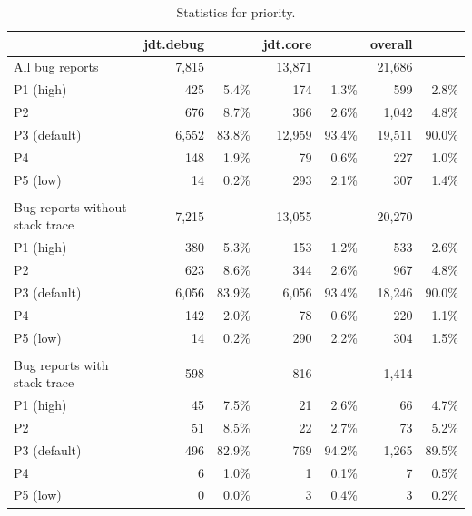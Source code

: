 \begin{table}[!ht]\footnotesize
	\centering
	\begin{tabular}{lrrrrrr}
		\toprule
		& jdt.debug && jdt.core && overall & \\
		\midrule
		All bug reports & 7,815 && 13,871 && 21,686 & \\
		\midrule
		P1 (high) & 425 & 5.4\% & 174 & 1.3\% & 599 & 2.8\%\\
		P2 & 676 & 8.7\% & 366 & 2.6\% & 1,042 & 4.8\%\\
		P3 (default) & 6,552 & 83.8\% & 12,959 & 93.4\% & 19,511 & 90.0\%\\
		P4 & 148 & 1.9\% & 79 & 0.6\% & 227 & 1.0\%\\
		P5 (low) & 14 & 0.2\% & 293 & 2.1\% & 307 & 1.4\%\\
		\\
		\midrule
		Bug reports without stack trace & 7,215 && 13,055 && 20,270 \\
		\midrule
		P1 (high) & 380 & 5.3\% & 153 & 1.2\% & 533 & 2.6\%\\
		P2 & 623 & 8.6\% & 344 & 2.6\% & 967 & 4.8\%\\
		P3 (default) & 6,056 & 83.9\% & 6,056 & 93.4\% & 18,246 & 90.0\%\\
		P4 & 142 & 2.0\% & 78 & 0.6\% & 220 & 1.1\%\\
		P5 (low) & 14 & 0.2\% & 290 & 2.2\% & 304 & 1.5\%\\
		\\
		\midrule
		Bug reports with stack trace & 598 && 816 && 1,414 \\
		\midrule
		P1 (high) & 45 & 7.5\% & 21 & 2.6\% & 66 & 4.7\%\\
		P2 & 51 & 8.5\% & 22 & 2.7\% & 73 & 5.2\%\\
		P3 (default) & 496 & 82.9\% & 769 & 94.2\% & 1,265 & 89.5\%\\
		P4 & 6 & 1.0\% & 1 & 0.1\% & 7 & 0.5\%\\
		P5 (low) & 0 & 0.0\% & 3 & 0.4\% & 3 & 0.2\%\\
		\bottomrule
	\end{tabular} 
	\caption{Statistics for priority.}
	\label{tab:priority}
\end{table}
 

